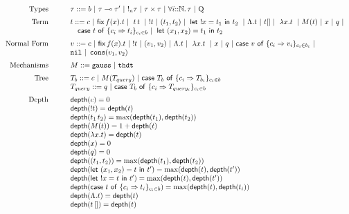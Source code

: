
 $$
 \begin{array}{rcl}
     \text{Types} & \quad & \tau ::= b \sep \tau \multimap \tau' \sep !_n \tau \sep
     \tau \times \tau \sep \tforallN{i}{\tau} \sep \query \\[2mm]

     \text{Term} & \quad & t ::= c \sep \fix{t} \sep \app{t}{t} \sep !t \sep (t_1,t_2) \sep  \letx{!x}{t_1}{t_2} \sep \Lambda.t \sep t[] \sep \abs{x}{t} \sep  M(t) \sep x \sep q \sep\\
     && \quad   \tcaseof{t}\ \{c_i \Rightarrow t_i\}_{c_i \in b}  \sep \letx{(x_1,x_2)}{t_1}{t_2} \\[2mm]
      
     \text{Normal Form} &\quad & v ::=  c \sep \fix{t} \sep !t \sep (v_1, v_2) \sep \Lambda. t \sep \abs{x}{t}  \sep x \sep q \sep \tcaseof{v}\ \{c_i \Rightarrow v_i\}_{c_i \in b_i} \sep\\
     && \enil \sep \econs(v_1,v_2)  \\[2mm]

     \text{Mechanisms} &\quad & M ::=  {\tt gauss} \sep {\tt thdt} \\[2mm]


	\text{Tree} &\quad& T_b :: = c \sep M(T_{query}) \sep \tcaseof{T_b}\ \{ c_i \Rightarrow T_{b_i}\}_{c_i \in b} \\

	\text{} &\quad& T_{query} :: = q \sep \tcaseof{T_b}\ \{ c_i \Rightarrow T_{query_i}\}_{c_i \in b} \\[2mm]
     \text{Depth} &\quad&   \depth(c) = 0 \\
       &\quad& \depth(!t) = \depth(t) \\
           &\quad&      \depth( \app{t_1}{t_2} ) = \max(\depth(t_1), \depth(t_2)) \\
            &\quad&  \depth(M(t)) = 1 + \depth(t) \\
             &\quad&  \depth(\abs{x}{t}) = \depth(t) \\
              &\quad& \depth(x) = 0 \\
              & \quad & \depth(q) = 0 \\
              & \quad & \depth((t_1, t_2)) = \max(\depth(t_1), \depth(t_2))\\
              & \quad & \depth(\letx{(x_1, x_2)}{t}{t'}) = \max(\depth(t), \depth(t'))\\
              & \quad & \depth{}(\letx{!x}{t}{t'}) = \max(\depth(t), \depth(t'))\\
              & \quad & \depth{}(\tcaseof{t}\ \{c_i \Rightarrow t_i\}_{c_i \in b}) = \max(\depth(t), \depth(t_i))\\
            & \quad & \depth(\Lambda.t) = \depth(t)\\
              & \quad & \depth(t\, []) = \depth(t)\\
\end{array}
$$

